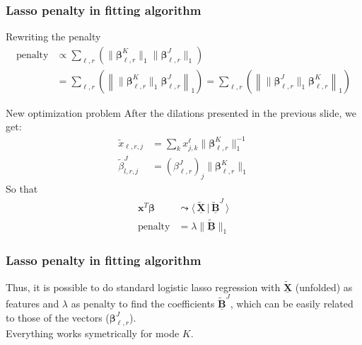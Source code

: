 \documentclass{beamer}
\begin{document}
\begin{frame}
    \frametitle{Lasso penalty in fitting algorithm}
    \begin{block}{Rewriting the penalty}
    \begin{align}
        \text{penalty} &\propto \sum\limits_{\ell,r} \left( \lVert \bm{\beta}_{\ell,r}^K \rVert_1 \lVert \bm{\beta}_{\ell,r}^J \rVert_1 \right)\\
        &= \sum\limits_{\ell,r} \left( \left\lVert  \lVert\bm{\beta}_{\ell,r}^K \rVert_1  \bm{\beta}_{\ell,r}^J \right\rVert_1 \right)  = \sum\limits_{\ell,r} \left( \left\lVert  \lVert\bm{\beta}_{\ell,r}^J \rVert_1  \bm{\beta}_{\ell,r}^K \right\rVert_1  \right)
    \end{align}
\end{block}
\end{frame}

\begin{frame}
    \begin{block}{New optimization problem}
        After the dilations presented in the previous slide, we get:
        \begin{align}
        \tilde{x}_{\ell,r,j} &= \sum\limits_{k}x_{j,k}^\ell\lVert \bm{\beta}_{\ell,r}^K\rVert_1^{-1}\\
        \tilde{\beta}_{l,r,j}^J &= 
        (\beta_{\ell,r}^J)_j\lVert \bm{\beta}_{\ell,r}^K \rVert_1 
        \end{align}
        \phantom{a}\hspace{40 pt}So that\\[-20 pt]
        \begin{align}
        \mathbf{x}^T\bm{\beta} & \leadsto  \langle \, \tilde{\underline{\mathbf{X}}}\,|\, \tilde{\underline{\mathbf{B}}}^J \,\rangle \\
        \text{penalty} &= \lambda \lVert \tilde{\underline{\mathbf{B}}}\rVert_1
        \end{align}
    \end{block}
    \frametitle{Lasso penalty in fitting algorithm}
    \noindent Thus, it is possible to do standard logistic lasso regression with $\tilde{\underline{\mathbf{X}}}$ (unfolded) as features and $\lambda$ as penalty to find the coefficients $\tilde{\underline{\mathbf{B}}}^J$, which can be easily related to those of the vectors ($\bm{\beta}_{\ell,r}^J$).\\[5 pt]
    Everything works symetrically for mode $K$.
\end{frame}
\end{document}
